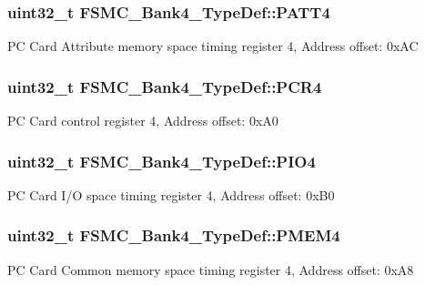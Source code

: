 \subsubsection[{\texorpdfstring{P\+A\+T\+T4}{PATT4}}]{ uint32\+\_\+t F\+S\+M\+C\+\_\+\+Bank4\+\_\+\+Type\+Def\+::\+P\+A\+T\+T4}\hypertarget{struct_f_s_m_c___bank4___type_def_a4cccc7802b573135311cc38e7f247ff5}{}\label{struct_f_s_m_c___bank4___type_def_a4cccc7802b573135311cc38e7f247ff5}
PC Card Attribute memory space timing register 4, Address offset\+: 0x\+AC 
\subsubsection[{\texorpdfstring{P\+C\+R4}{PCR4}}]{ uint32\+\_\+t F\+S\+M\+C\+\_\+\+Bank4\+\_\+\+Type\+Def\+::\+P\+C\+R4}\hypertarget{struct_f_s_m_c___bank4___type_def_a0470b5bbb53e9f1bbde09829371eb72f}{}\label{struct_f_s_m_c___bank4___type_def_a0470b5bbb53e9f1bbde09829371eb72f}
PC Card control register 4, Address offset\+: 0x\+A0 
\subsubsection[{\texorpdfstring{P\+I\+O4}{PIO4}}]{ uint32\+\_\+t F\+S\+M\+C\+\_\+\+Bank4\+\_\+\+Type\+Def\+::\+P\+I\+O4}\hypertarget{struct_f_s_m_c___bank4___type_def_a531ebc38c47bebfb198eafb4de24cb2a}{}\label{struct_f_s_m_c___bank4___type_def_a531ebc38c47bebfb198eafb4de24cb2a}
PC Card I/O space timing register 4, Address offset\+: 0x\+B0 
\subsubsection[{\texorpdfstring{P\+M\+E\+M4}{PMEM4}}]{ uint32\+\_\+t F\+S\+M\+C\+\_\+\+Bank4\+\_\+\+Type\+Def\+::\+P\+M\+E\+M4}\hypertarget{struct_f_s_m_c___bank4___type_def_a4ed4ce751e7a8b3207bd20675b1d9085}{}\label{struct_f_s_m_c___bank4___type_def_a4ed4ce751e7a8b3207bd20675b1d9085}
PC Card Common memory space timing register 4, Address offset\+: 0x\+A8 
